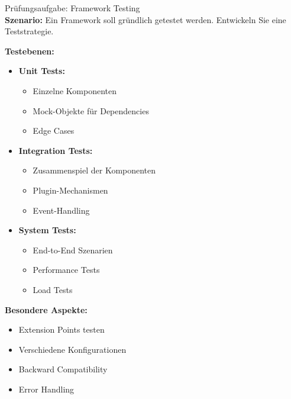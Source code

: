 \begin{example2}{Prüfungsaufgabe: Framework Testing}\\
\textbf{Szenario:}
Ein Framework soll gründlich getestet werden. Entwickeln Sie eine Teststrategie.

\textbf{Testebenen:}
\begin{itemize}
    \item \textbf{Unit Tests:}
    \begin{itemize}
        \item Einzelne Komponenten
        \item Mock-Objekte für Dependencies
        \item Edge Cases
    \end{itemize}
    
    \item \textbf{Integration Tests:}
    \begin{itemize}
        \item Zusammenspiel der Komponenten
        \item Plugin-Mechanismen
        \item Event-Handling
    \end{itemize}
    
    \item \textbf{System Tests:}
    \begin{itemize}
        \item End-to-End Szenarien
        \item Performance Tests 
        \item Load Tests
    \end{itemize}
\end{itemize}

\textbf{Besondere Aspekte:}
\begin{itemize}
    \item Extension Points testen
    \item Verschiedene Konfigurationen
    \item Backward Compatibility
    \item Error Handling
\end{itemize}
\end{example2}

\columnbreak

